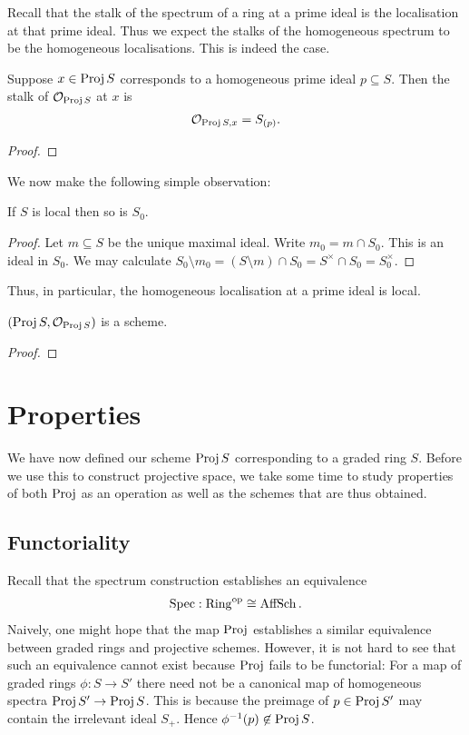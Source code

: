 \documentclass{article}
\begin{document}
Recall that the stalk of the spectrum of a ring at a prime ideal
is the localisation at that prime ideal. Thus we expect the stalks
of the homogeneous spectrum to be the homogeneous localisations.
This is indeed the case.

\begin{proposition}\label{thm:stalks}
  Suppose $x\in\operatorname{Proj} S$
  corresponds to a homogeneous prime ideal $p\subseteq S$. Then the
  stalk of $\mathcal O_{\operatorname{Proj} S}$ at $x$ is
  \begin{align*}
    \mathcal O_{\operatorname{Proj} S,x} = S_{(p)}.
  \end{align*}
  \begin{proof}
    \missingproof
  \end{proof}
\end{proposition}

We now make the following simple observation:
\begin{lemma}
  If $S$ is local then so is $S_0$.
  \begin{proof}
    Let $m\subseteq S$ be the unique maximal ideal. Write
    $m_0 = m \cap S_0$. This is an ideal in $S_0$. We may calculate
    $S_0\setminus m_0 = (S\setminus m)\cap S_0 = S^\times\cap S_0 = S_0^\times$.
  \end{proof}
\end{lemma}
Thus, in particular, the homogeneous localisation at a prime ideal
is local.

\begin{proposition}
  $(\operatorname{Proj} S, \mathcal O_{\operatorname{Proj} S})$ is a scheme.
  \begin{proof}
    \missingproof
  \end{proof}
\end{proposition}

\section{Properties}

We have now defined our scheme $\operatorname{Proj} S$ corresponding to a
graded ring $S$. Before we use this to construct projective space,
we take some time to study properties of both $\operatorname{Proj}$ as an operation
as well as the schemes that are thus obtained.

\subsection{Functoriality}

Recall that the spectrum construction establishes an equivalence
\begin{align*}
  \operatorname{Spec} : {\operatorname{Ring}}^\text{op} \cong \operatorname{AffSch}.
\end{align*}
Naively, one might hope that the map $\operatorname{Proj}$ establishes a similar
equivalence between graded rings and projective schemes.
However, it is not hard to see that such an equivalence cannot exist
because $\operatorname{Proj}$ fails to be functorial: For a map of graded rings
$\phi : S \to S'$ there need not be a canonical map of homogeneous
spectra $\operatorname{Proj} S' \to \operatorname{Proj} S$. This is because the preimage of
$p\in\operatorname{Proj} S'$ may contain the irrelevant ideal $S_+$. Hence
${\phi}^{-1}(p)\not\in\operatorname{Proj} S$.
\end{document}
